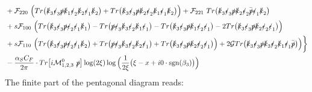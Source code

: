 \documentclass[aps,prd,superscriptaddress,floatfix,showpacs]{revtex4}
\begin{document}
\begin{equation}
\begin{aligned}
&+\mathcal{F}_{220}~\Big( Tr\big( \slashed{k}_3 \slashed{\epsilon}_3 \slashed{p} \slashed{k}_1 \slashed{\epsilon}_2 \slashed{k}_2 \slashed{\epsilon}_1 \slashed{k}_2 \big) + Tr\big( \slashed{k}_3 \slashed{\epsilon}_3 \slashed{p} \slashed{k}_2 \slashed{\epsilon}_2 \slashed{k}_1 \slashed{\epsilon}_1 \slashed{k}_2 \big) \Big) 
+\mathcal{F}_{221}~Tr\big( \slashed{k}_3 \slashed{\epsilon}_3 \slashed{p} \slashed{k}_2 \slashed{\epsilon}_2 \bar{\slashed{p}} \slashed{\epsilon}_1 \slashed{k}_2 \big)\\
& +s \mathcal{F}_{100}~ \Big( Tr\big(\slashed{k}_3 \slashed{\epsilon}_3 \slashed{p} \slashed{\epsilon}_2 \slashed{\epsilon}_1 \slashed{k}_1 \big) -  Tr\big(\slashed{p}  \slashed{\epsilon}_3 \slashed{k}_3 \slashed{\epsilon}_2 \slashed{k}_1 \slashed{\epsilon}_1  \big) - Tr\big(\slashed{k}_3 \slashed{\epsilon}_3 \slashed{p} \slashed{k}_1 \slashed{\epsilon}_2 \slashed{\epsilon}_1 \big) -2Tr\big(\slashed{k}_3 \slashed{\epsilon}_3 \slashed{p} \slashed{k}_2 \slashed{\epsilon}_2 \slashed{\epsilon}_1 \big) \Big)  \\
&+s \mathcal{F}_{110}~\Big( Tr\big(\slashed{k}_3 \slashed{\epsilon}_3 \slashed{p} \slashed{\epsilon}_2 \slashed{\epsilon}_1 \slashed{k}_2 \big) + Tr\big(\slashed{p}  \slashed{\epsilon}_3 \slashed{k}_3 \slashed{\epsilon}_2 \slashed{k}_2 \slashed{\epsilon}_1  \big)+ Tr\big(\slashed{k}_3 \slashed{\epsilon}_3 \slashed{p} \slashed{k}_2 \slashed{\epsilon}_2 \slashed{\epsilon}_1 \big) \Big)
+ 2 \mathcal{G} Tr\big( \slashed{k}_3 \slashed{\epsilon}_3 \slashed{p} \slashed{k}_3 \slashed{\epsilon}_2 \slashed{k}_1 \slashed{\epsilon}_1 \bar{\slashed{p}} \big) \Big) \bigg\}\\
& - \frac{\alpha_SC_F}{2\pi} \cdot Tr\big[ i\mathcal{M}^0_{1,2,3}~\slashed{p}\big] \log(2\xi) \log \Big{(} \frac{1}{2\xi}\big{(}\xi - x + i0\cdot \mathrm{sgn}(\beta_3)\big{)} \Big{)}
\end{aligned}
\end{equation}
The finite part of the pentagonal diagram reads:
\end{document}
